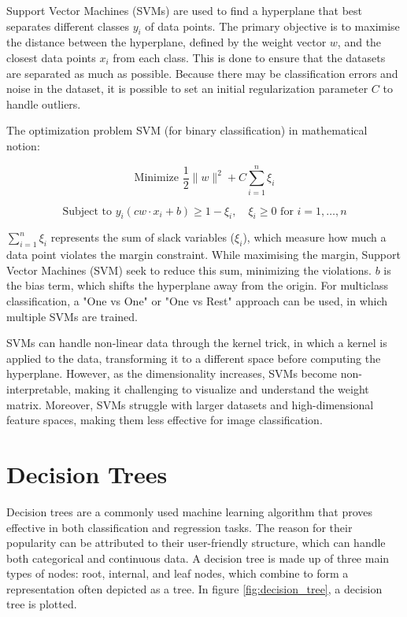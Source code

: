 Support Vector Machines (SVMs) \cite{boser1992training} are used to find a hyperplane that best separates different classes $y_i$ of data points. The primary objective is to maximise the distance between the hyperplane, defined by the weight vector ${w}$, and the closest data points $x_i$ from each class. This is done to ensure that the datasets are separated as much as possible. Because there may be classification errors and noise in the dataset, it is possible to set an initial regularization parameter $C$ to handle outliers.

The optimization problem SVM (for binary classification) in mathematical notion:

$$\text{Minimize } \frac{1}{2} \|{w}\|^2 + C \sum_{i=1}^{n} \xi_i$$

$$\text{Subject to } y_i (c{w} \cdot x_i + b) \geq 1 - \xi_i, \quad \xi_i \geq 0 \text{ for } i = 1, \ldots, n$$

$\sum_{i=1}^{n} \xi_i$ represents the sum of slack variables ($\xi_i$), which measure how much a data point violates the margin constraint. While maximising the margin, Support Vector Machines (SVM) seek to reduce this sum, minimizing the violations. $ b $ is the bias term, which shifts the hyperplane away from the origin. For multiclass classification, a "One vs One" or "One vs Rest" approach can be used, in which multiple SVMs are trained.

SVMs can handle non-linear data through the kernel trick, in which a kernel is applied to the data, transforming it to a different space before computing the hyperplane.  However, as the dimensionality increases, SVMs become non-interpretable, making it challenging to visualize and understand the weight matrix. Moreover, SVMs struggle with larger datasets and high-dimensional feature spaces, making them less effective for image classification.


\section{Decision Trees}
\label{decision_tree}


Decision trees are a commonly used machine learning algorithm that proves effective in both classification and regression tasks. The reason for their popularity can be attributed to their user-friendly structure, which can handle both categorical and continuous data. A decision tree is made up of three main types of nodes: root, internal, and leaf nodes, which combine to form a representation often depicted as a tree. In figure \ref{fig:decision_tree}, a decision tree is plotted. 

